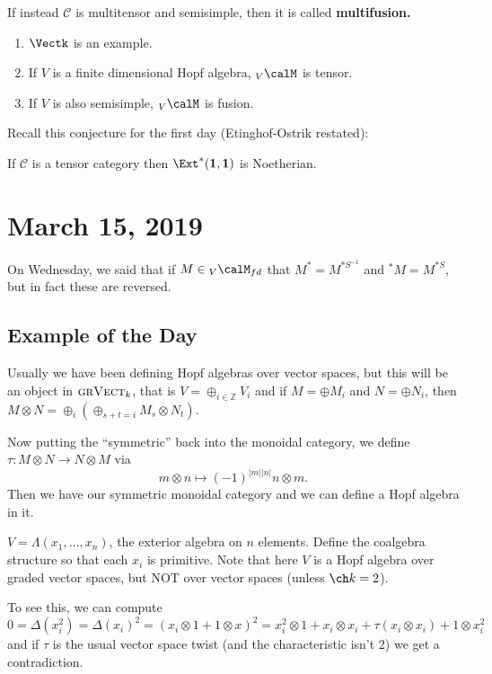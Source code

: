 \documentclass[12pt]{article}
\newcommand*{\Z}{
\mathbb{Z}
}
\begin{document}
\begin{rmk}
	If instead $\mathscr C$ is multitensor and semisimple, then it is called \textbf{multifusion.}
\end{rmk}
\begin{ex}
	\begin{enumerate}
		\item $\Vectk$ is an example.
		\item If $V$ is a finite dimensional Hopf algebra, ${_V\calM}$ is tensor.
		\item If $V$ is also semisimple, ${_V\calM}$ is fusion.
	\end{enumerate}
\end{ex}
Recall this conjecture for the first day (Etinghof-Ostrik restated):
\begin{conj}
	If $\mathscr C$ is a tensor category then $\Ext^*(\mathbf{1},\mathbf{1})$ is Noetherian.
\end{conj}

\section{March 15, 2019}
On Wednesday, we said that if $M\in{_V\calM_{fd}}$ that $M^*=M^{*S^{-1}}$ and ${^*M}=M^{*S}$,
but in fact these are reversed.
\subsection{Example of the Day}
\begin{ex}
	Usually we have been defining Hopf algebras over vector spaces, but this will be an object in $\text{\sc grVect}_k$,
	that is $V=\oplus_{i\in\Z}V_i$ and if $M=\oplus M_i$ and $N=\oplus N_i$, then $M\otimes N=\oplus_i(\oplus_{s+t=i}M_s\otimes N_t)$.

	Now putting the ``symmetric'' back into the monoidal category, we define $\tau:M\otimes N\to N\otimes M$ via
	\[m\otimes n\mapsto (-1)^{|m||n|}n\otimes m.\]
	Then we have our symmetric monoidal category and we can define a Hopf algebra in it.

	$V=\Lambda(x_1,\dots,x_n)$, the exterior algebra on $n$ elements. Define the coalgebra structure 
	so that each $x_i$ is primitive. Note that here $V$ is a Hopf algebra over graded vector spaces, but 
	NOT over vector spaces (unless $\ch k=2$).

	To see this, we can compute 
	\[0=\Delta(x_i^2)=\Delta(x_i)^2=(x_i\otimes 1+1\otimes x)^2=x_i^2\otimes 1+x_i\otimes x_i+\tau(x_i\otimes x_i)+1\otimes x_i^2\]
	and if $\tau$ is the usual vector space twist (and the characteristic isn't 2) we get a contradiction.
\end{ex}
\end{document}
